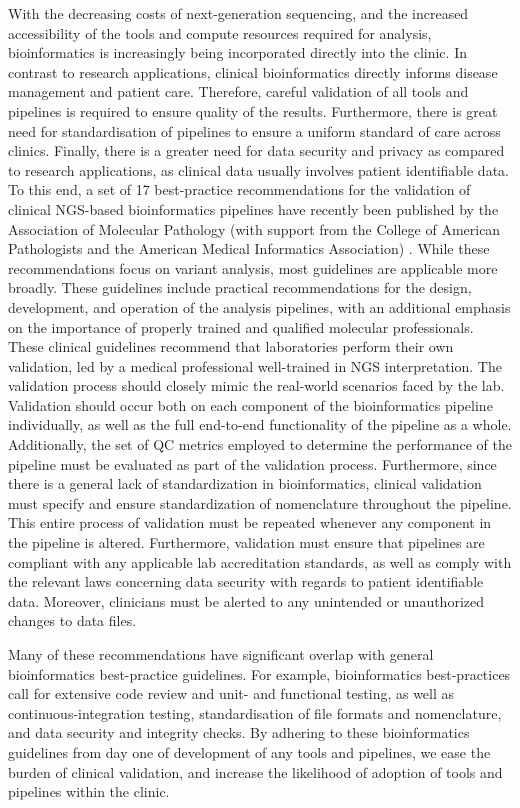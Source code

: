 \begin{justify}
With the decreasing costs of next-generation sequencing, and the increased accessibility of the tools and compute resources required for analysis, bioinformatics is increasingly being incorporated directly into the clinic. In contrast to research applications, clinical bioinformatics directly informs disease management and patient care.
Therefore, careful validation of all tools and pipelines is required to ensure quality of the results. Furthermore, there is great need for standardisation of pipelines to ensure a uniform standard of care across clinics. Finally, there is a greater need for data security and privacy as compared to research applications, as clinical data usually involves patient identifiable data.
To this end, a set of 17 best-practice recommendations for the validation of clinical NGS-based bioinformatics pipelines have recently been published by the Association of Molecular Pathology (with support from the College of American Pathologists and the American Medical Informatics Association) \cite{roy2018standards}.
While these recommendations focus on variant analysis, most guidelines are applicable more broadly. These guidelines include practical recommendations for the design, development, and operation of the analysis pipelines, with an additional emphasis on the importance of properly trained and qualified molecular professionals.
These clinical guidelines recommend that laboratories perform their own validation, led by a medical professional well-trained in NGS interpretation. The validation process should closely mimic the real-world scenarios faced by the lab. Validation should occur both on each component of the bioinformatics pipeline individually, as well as the full end-to-end functionality of the pipeline as a whole.
Additionally, the set of QC metrics employed to determine the performance of the pipeline must be evaluated as part of the validation process.
Furthermore, since there is a general lack of standardization in bioinformatics, clinical validation must specify and ensure standardization of nomenclature throughout the pipeline. This entire process of validation must be repeated whenever any component in the pipeline is altered.
Furthermore, validation must ensure that pipelines are compliant with any applicable lab accreditation standards, as well as comply with the relevant laws concerning data security with regards to patient identifiable data.
Moreover, clinicians must be alerted to any unintended or unauthorized changes to data files.


Many of these recommendations have significant overlap with general bioinformatics best-practice guidelines.
For example, bioinformatics best-practices call for extensive code review and unit- and functional testing, as well as continuous-integration testing, standardisation of file formats and nomenclature, and data security and integrity checks.
By adhering to these bioinformatics guidelines from day one of development of any tools and pipelines, we ease the burden of clinical validation, and increase the likelihood of adoption of tools and pipelines within the clinic.


\end{justify}
